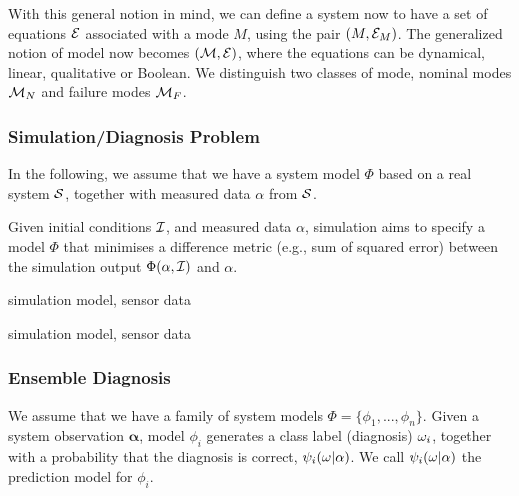 With this general notion in mind, we can define a system now to have a set of equations $\cal E$ associated with a mode $M$, using the pair $(M,{\cal E}_M)$. The generalized notion of model now becomes $({\cal M},{\cal E})$, where the equations can be dynamical, linear, qualitative or Boolean.
We distinguish two classes of mode, nominal modes ${\cal M}_N$ and failure modes ${\cal M}_F$.


\subsubsection{Simulation/Diagnosis Problem}

In the following, we assume that we have a system model $\Phi$ based on a real system $\cal S$, together with measured data $\alpha$ from $\cal S$.

\begin{definition}
Given 
initial conditions $\cal I$, and measured data $\alpha$, simulation aims to specify a model $\Phi$ that minimises a difference metric (e.g., sum of squared error) between the simulation output $\Phi(\alpha, {\cal I})$ and $\alpha$.
\end{definition}




\begin{definition}
simulation model, sensor data
\end{definition}

\begin{definition}
simulation model, sensor data
\end{definition}

\begin{definition}[Diagnosis $\d$]

\end{definition}


\subsubsection{Ensemble Diagnosis}



We assume that we have a family of system models $\Phi = \{\phi_1,...,\phi_n\}$.
Given a system observation $\mathbf{\alpha}$, model $\phi_i$ generates a class label (diagnosis) $\omega_i$, together with a probability that the diagnosis is correct, $\psi_i(\omega|\mathbf{\alpha})$. We call $\psi_i(\omega|\mathbf{\alpha})$ the prediction model for  $\phi_i$.



